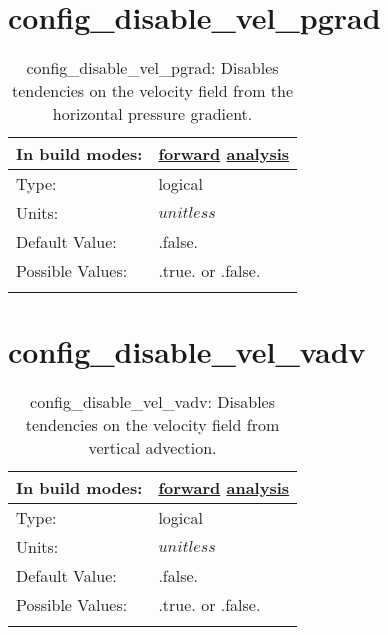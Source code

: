 \section[config\_disable\_vel\_pgrad]{config\_disable\_vel\_pgrad}
\label{sec:nm_sec_config_disable_vel_pgrad}
\begin{center}
\begin{longtable}{| p{2.0in} || p{4.0in} |}
    \hline
    In build modes: & \hyperref[subsec:forward_nm_tab_debug]{forward} \hyperref[subsec:analysis_nm_tab_debug]{analysis} \\
    \hline
    Type: & logical \\
    \hline
    Units: & $unitless$ \\
    \hline
    Default Value: & .false. \\
    \hline
    Possible Values: & .true. or .false. \\
    \hline
    \caption{config\_disable\_vel\_pgrad: Disables tendencies on the velocity field from the horizontal pressure gradient.}
\end{longtable}
\end{center}
\section[config\_disable\_vel\_vadv]{config\_disable\_vel\_vadv}
\label{sec:nm_sec_config_disable_vel_vadv}
\begin{center}
\begin{longtable}{| p{2.0in} || p{4.0in} |}
    \hline
    In build modes: & \hyperref[subsec:forward_nm_tab_debug]{forward} \hyperref[subsec:analysis_nm_tab_debug]{analysis} \\
    \hline
    Type: & logical \\
    \hline
    Units: & $unitless$ \\
    \hline
    Default Value: & .false. \\
    \hline
    Possible Values: & .true. or .false. \\
    \hline
    \caption{config\_disable\_vel\_vadv: Disables tendencies on the velocity field from vertical advection.}
\end{longtable}
\end{center}
